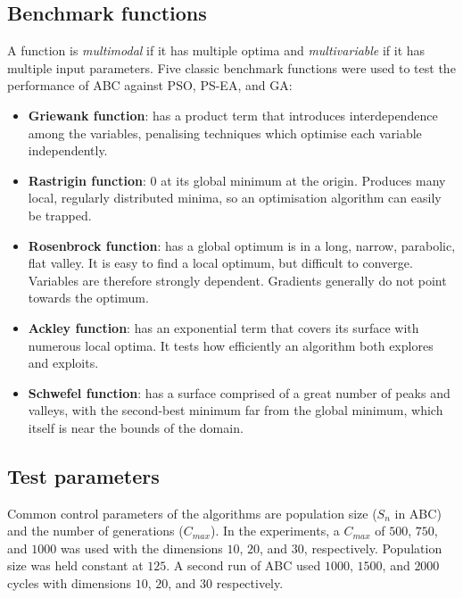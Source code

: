 \documentclass{article}
\begin{document}
\subsection{Benchmark functions}

A function is \textit{multimodal} if it has multiple optima and \textit{multivariable} if it has multiple input parameters. Five classic benchmark functions \cite{SS03} were used to test the performance of ABC against PSO, PS-EA, and GA:

\begin{itemize}

	\item{\textbf{Griewank function}: has a product term that introduces interdependence among the variables, penalising techniques which optimise each variable independently.}
	\item{\textbf{Rastrigin function}: 0 at its global minimum at the origin. Produces many local, regularly distributed minima, so an optimisation algorithm can easily be trapped.}
	\item{\textbf{Rosenbrock function}: has a global optimum is in a long, narrow, parabolic, flat valley. It is easy to find a local optimum, but difficult to converge. Variables are therefore strongly dependent. Gradients generally do not point towards the optimum.}
	\item{\textbf{Ackley function}: has an exponential term that covers its surface with numerous local optima. It tests how efficiently an algorithm both explores and exploits}.
	\item{\textbf{Schwefel function}: has a surface comprised of a great number of peaks and valleys, with the second-best minimum far from the global minimum, which itself is near the bounds of the domain.}

\end{itemize}

\subsection{Test parameters}

Common control parameters of the algorithms are population size ($S_n$ in ABC) and the number of generations ($C_{max}$). In the experiments, a $C_{max}$ of $500$, $750$, and $1000$ was used with the dimensions $10$, $20$, and $30$, respectively. Population size was held constant at $125$. A second run of ABC used $1000$, $1500$, and $2000$ cycles with dimensions $10$, $20$, and $30$ respectively.
\end{document}
